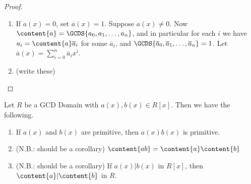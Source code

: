 \documentclass{article}
\begin{document}
\begin{proof} \mbox{}
\begin{enumerate}
\item If $a(x) = 0$, set $\overline{a}(x) = 1$. Suppose $a(x) \neq 0$. Now $\content{a} = \GCDS{a_0,a_1,\ldots,a_n}$, and in particular for each $i$ we have $a_i = \content{a}\overline{a}_i$ for some $\overline{a}_i$, and $\GCDS{\overline{a}_0, \overline{a}_1, \ldots, \overline{a}_n} = 1$. Let $\overline{a}(x) = \sum_{i=0}^n \overline{a}_i x^i$.

\item (write these)
\end{enumerate}
\end{proof}

\begin{prop}
Let $R$ be a GCD Domain with $a(x), b(x) \in R[x]$. Then we have the following.
\begin{enumerate}
\item If $a(x)$ and $b(x)$ are primitive, then $a(x)b(x)$ is primitive.
\item (N.B.: should be a corollary) $\content{ab} = \content{a}\content{b}$
\item (N.B.: should be a corollary) If $a(x)|b(x)$ in $R[x]$, then $\content{a}|\content{b}$ in $R$.
\end{enumerate}
\end{prop}
\end{document}
